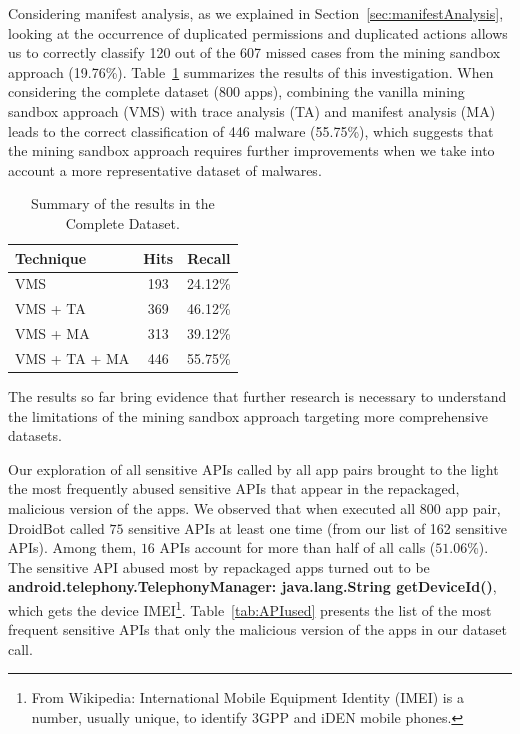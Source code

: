 Considering
manifest analysis, as we explained in Section~\ref{sec:manifestAnalysis},
looking at the occurrence of duplicated permissions and duplicated 
actions allows us to correctly classify \num{120} out of the \num{607} missed cases
from the mining sandbox approach (\num{19.76}\%).                                   
Table~\ref{tab:mfa-complete} summarizes the results of this investigation. When considering the 
complete dataset (\num{800} apps), combining the vanilla
mining sandbox approach (VMS) with trace analysis (TA) and
manifest analysis (MA) leads to the correct classification
of \num{446} malware (\num{55.75}\%), which suggests that
the mining sandbox approach requires further improvements when
we take into account a more representative dataset
of malwares. 


\begin{table}[ht]
  \caption{Summary of the results in the Complete Dataset.}
  \centering
  \begin{small}
  \begin{tabular}{lcc}\toprule
  Technique      & Hits & Recall \\ \midrule 
  VMS            & 193  & \num{24.12}\% \\ 
  VMS + TA       & 369  & \num{46.12}\%  \\
  VMS + MA       & 313  & \num{39.12}\% \\
  VMS + TA + MA  & 446  & \num{55.75}\% \\  \bottomrule
  \end{tabular}
  \end{small}
 \label{tab:mfa-complete}
\end{table}

\begin{obs}{6}{}
  The results so far bring evidence that
  further research is necessary to understand
  the limitations of the mining sandbox approach
  targeting more comprehensive datasets.
\end{obs}

Our exploration of all sensitive APIs called by all app pairs brought to the light the most frequently abused sensitive APIs that
appear in the repackaged, malicious version of the apps. We observed that when executed all 800 app pair, DroidBot called $75$ sensitive APIs at least one time (from our list of 162 sensitive APIs). Among them, $16$ APIs account for more than half of all calls ($51.06$\%).
The sensitive API abused most by repackaged apps turned out to be \textbf{android.telephony.TelephonyManager: java.lang.String getDeviceId()}, which gets the device
IMEI\footnote{From Wikipedia: International Mobile Equipment Identity (IMEI) is a number, usually unique, to identify 3GPP and iDEN mobile phones.}.
Table~\ref{tab:APIused} presents the list of the most frequent sensitive APIs that only the malicious
version of the apps in our dataset call.


